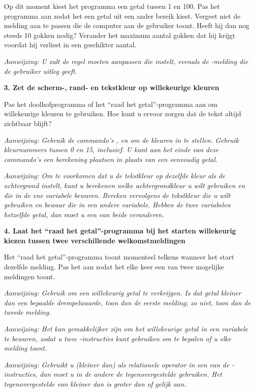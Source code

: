 Op dit moment kiest het programma een getal tussen 1 en 100. Pas het programma aan zodat het een getal uit een ander bereik kiest. Vergeet niet de melding aan te passen die de computer aan de gebruiker toont. Heeft hij dan nog steeds 10 gokken nodig? Verander het maximum aantal gokken dat hij krijgt voordat hij verliest in een geschikter aantal.

{\em Aanwijzing: U zult de regel moeten aanpassen die  instelt, evenals de -melding die de gebruiker uitleg geeft.}

{\bf 3. Zet de scherm-, rand- en tekstkleur op willekeurige kleuren}

Pas het doolhofprogramma of het ``raad het getal''-programma aan om willekeurige kleuren te gebruiken. Hoe kunt u ervoor zorgen dat de tekst altijd zichtbaar blijft?

{\em Aanwijzing: Gebruik de commando's ,  en  om de kleuren in te stellen. Gebruik kleurnummers tussen 0 en 15, inclusief. U kunt aan het einde van deze commando's een berekening plaatsen in plaats van een eenvoudig getal.}

{\em Aanwijzing: Om te voorkomen dat u de tekstkleur op dezelfde kleur als de achtergrond instelt, kunt u berekenen welke achtergrondkleur u wilt gebruiken en die in de ene variabele bewaren. Bereken vervolgens de tekstkleur die u wilt gebruiken en bewaar die in een andere variabele. Hebben de twee variabelen hetzelfde getal, dan moet u een van beide veranderen.}

{\bf 4. Laat het ``raad het getal''-programma bij het starten willekeurig kiezen tussen twee verschillende welkomstmeldingen}

Het ``raad het getal''-programma toont momenteel telkens wanneer het start dezelfde melding. Pas het aan zodat het elke keer een van twee mogelijke meldingen toont.

{\em Aanwijzing: Gebruik  om een willekeurig getal te verkrijgen. Is dat getal kleiner dan een bepaalde drempelwaarde, toon dan de eerste melding; zo niet, toon dan de tweede melding.}

{\em Aanwijzing: Het kan gemakkelijker zijn om het willekeurige getal in een variabele te bewaren, zodat u twee -instructies kunt gebruiken om te bepalen of u elke melding toont.}

{\em Aanwijzing: Gebruikt u \stw{<} (kleiner dan) als relationele operator in een van de -instructies, dan moet u in de andere de tegenovergestelde gebruiken. Het tegenovergestelde van kleiner dan is groter dan of gelijk aan.}

